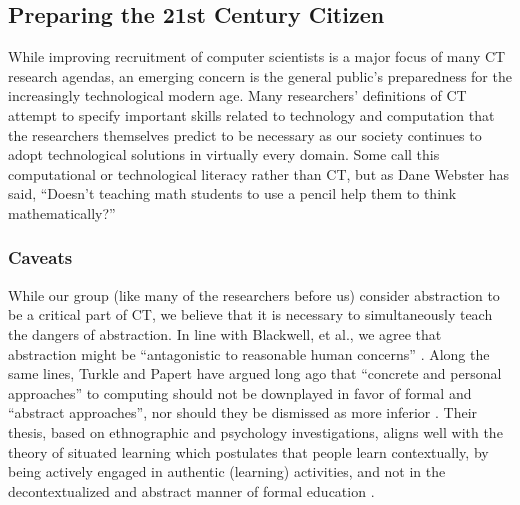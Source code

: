 \documentclass{acm_proc_article-sp}
\begin{document}
\subsection{Preparing the 21st Century Citizen}
While improving recruitment of computer scientists is a major focus of many CT research agendas, an emerging concern is the general public's preparedness for the increasingly technological modern age.
Many researchers' definitions of CT attempt to specify important skills related to technology and computation that the researchers themselves predict to be necessary as our society continues to adopt technological solutions in virtually every domain.
Some call this computational or technological literacy rather than CT, but as Dane Webster has said, ``Doesn{'}t teaching math students to use a pencil help them to think mathematically?'' \cite{webster2013quote}

\subsubsection{Caveats}
While our group (like many of the researchers before us) consider abstraction to be a critical part of CT, we believe that it is necessary to simultaneously teach the dangers of abstraction.
In line with Blackwell, et al., we agree that abstraction might be ``antagonistic to reasonable human concerns'' \cite{blackwell2008abstract}.
Along the same lines, Turkle and Papert have argued long ago that ``concrete and personal approaches'' to computing should not be downplayed in favor of formal and ``abstract approaches'', nor should they be dismissed as more inferior \cite{turkle1990epistemological}.
Their thesis, based on ethnographic and psychology investigations, aligns well with the theory of situated learning which postulates that people learn contextually, by being actively engaged in authentic (learning) activities, and not in the decontextualized and abstract manner of formal education \cite{brown1989situated}.


\end{document}
